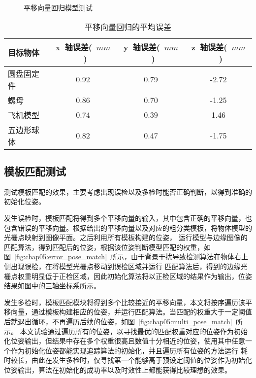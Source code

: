 \begin{figure}[t] %
    \centering%
    \caption{平移向量回归模型测试}
    \label{fig:chap05:video_trans_regre}
    \end{figure}

\begin{table}[t]
    \centering
    \caption{平移向量回归的平均误差}
    \label{table:chap05:regre_dataset}
    \begin{tabular}{lccc}
        \toprule
        目标物体 &  x~轴误差(~$mm$~)   &y~轴误差(~$mm$~)   & z~轴误差(~$mm$~)   \\
        \midrule
        圆盘固定件   & 0.92 & 0.79 & -2.72\\ 
        螺母  & 0.86 & 0.70 & -1.25 \\ 
        飞机模型  & 0.74 & 0.39 & 1.46 \\ 
        五边形球体  & 0.82 & 0.47 & -1.75\\ 
        \bottomrule
    \end{tabular}
    \end{table}


\subsection{模板匹配测试}
\label{sec:template_test}
测试模板匹配的效果，主要考虑出现误检以及多检时能否正确判断，以得到准确的初始化位姿。


发生误检时，模板匹配将得到多个平移向量的输入，其中包含正确的平移向量，也包含错误的平移向量。根据给出的平移向量以及对应的粗分类模板，将物体模型的光栅点映射到图像平面。之后利用所有模板构建的位姿，
运行模型与边缘图像的匹配算法，得到匹配后的位姿，根据该位姿判断模型匹配的权重，如图~\ref{fig:chap05:error_pose_match}~所示，由于背景干扰导致检测算法在物体右上侧出现误检，在将模型光栅点移动到误检区域并运行
匹配算法后，得到的边缘光栅点权重明显低于正检区域，因此初始化算法将以正检区域的结果作为输出，位姿结果如图中的三轴坐标系所示。


发生多检时，模板匹配模块将得到多个比较接近的平移向量，本文将按序遍历该平移向量，通过模板构建相应的位姿，并运行匹配算法。当匹配的权重大于一定阈值后就退出循环，不再遍历后续的位姿，如图~\ref{fig:chap05:multi_pose_match}~所示。
本文试验通过遍历所有的位姿，以寻找最优的匹配权重对应的位姿作为初始化位姿输出，但结果中存在多个权重很高且数值十分相近的位姿，使用其中任意一个作为初始化位姿都能实现追踪算法的初始化，并且遍历所有位姿的方法运行
耗时较长，由此在发生多检时，仅寻找第一个能够高于预设定阈值的位姿作为初始化位姿输出，算法在初始化的成功率以及时效性上都能获得比较理想的效果。

